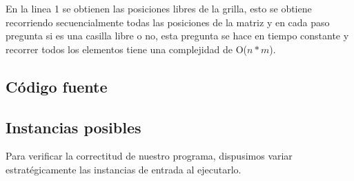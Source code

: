 En la linea 1 se obtienen las posiciones libres de la grilla, esto se obtiene recorriendo secuencialmente todas las posiciones de la matriz y en cada paso pregunta si es una casilla libre o no, esta pregunta se hace en tiempo constante y recorrer todos los elementos tiene una complejidad de O($n*m$).

\subsection{Código fuente}


\subsection{Instancias posibles}
Para verificar la correctitud de nuestro programa, dispusimos variar estratégicamente las instancias de entrada al ejecutarlo.
